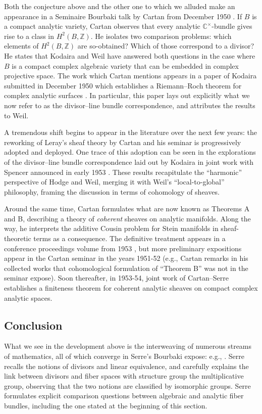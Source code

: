 \documentclass[11pt,leqno]{article}
\newcommand{\cplx}{{\mathbb C}}
\newcommand{\Z}{{\mathbb Z}}
\renewcommand{\1}{{\rm 1\hspace*{-0.4ex}%
\rule{0.1ex}{1.52ex}\hspace*{0.2ex}}}
\newcommand{\<}[1]{{\langle}#1 {\rangle}}
\theoremstyle{plain}
\theoremstyle{definition}
\theoremstyle{remark}
\numberwithin{equation}{subsection}
\begin{document}
Both the conjecture above and the other one to which we alluded make an appearance in a Seminaire Bourbaki talk by Cartan from December 1950 \cite[\S 8]{Cartan1952Bourbaki34}.  If $B$ is a compact analytic variety, Cartan observes that every analytic $\cplx^{\times}$-bundle gives rise to a class in $H^2(B,\Z)$.  He isolates two comparison problems: which elements of $H^2(B,\Z)$ are so-obtained?  Which of those correspond to a divisor?  He states that Kodaira and Weil have answered both questions in the case where $B$ is a compact complex algebraic variety that can be embedded in complex projective space.  The work which Cartan mentions appears in a paper of Kodaira submitted in December 1950 which establishes a Riemann--Roch theorem for complex analytic surfaces \cite{Kodaira1951RiemannRoch}.   In particular, this paper lays out explicitly what we now refer to as the divisor--line bundle correspondence, and attributes the results to Weil.

A tremendous shift begins to appear in the literature over the next few years: the reworking of Leray's sheaf theory by Cartan and his seminar is progressively adopted and deployed.  One trace of this adoption can be seen in the explorations of the divisor--line bundle correspondence laid out by Kodaira in joint work with Spencer announced in early 1953 \cite{KodairaSheaf, KodairaSpencer, KodairaSpencerII}.  These results recapitulate the ``harmonic'' perspective of Hodge and Weil, merging it with Weil's ``local-to-global'' philosophy, framing the discussion in terms of cohomology of sheaves.  

Around the same time, Cartan formulates what are now known as Theorems A and B, describing a theory of {\em coherent} sheaves on analytic manifolds.  Along the way, he interprets the additive Cousin problem for Stein manifolds in sheaf-theoretic terms as a consequence.  The definitive treatment appears in a conference proceedings volume from 1953 \cite{CartanBruxelles}, but more preliminary expositions appear in the Cartan seminar in the years 1951-52 (e.g., Cartan remarks in his collected works that cohomological formulation of ``Theorem B'' was not in the seminar expose).  Soon thereafter, in 1953-54, joint work of Cartan--Serre establishes a finiteness theorem for coherent analytic sheaves on compact complex analytic spaces.  

\subsection{Conclusion}
What we see in the development above is the interweaving of numerous streams of mathematics, all of which converge in Serre's Bourbaki expose: e.g., \cite[\S 2 Exemple 1]{SerreFSBBKI}.  Serre recalls the notions of divisors and linear equivalence, and carefully explains the link between divisors and fiber spaces with structure group the multiplicative group, observing that the two notions are classified by isomorphic groups.  Serre formulates explicit comparison questions between algebraic and analytic fiber bundles, including the one stated at the beginning of this section.  
\end{document}
